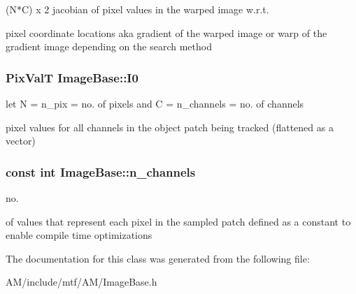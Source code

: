 (N$\ast$\-C) x 2 jacobian of pixel values in the warped image w.\-r.\-t. 

pixel coordinate locations aka gradient of the warped image or warp of the gradient image depending on the search method \hypertarget{classImageBase_a6e5beaedb0a6d8e511446443dc2b80dc}{
\subsubsection[{I0}]{\setlength{\rightskip}{0pt plus 5cm}Pix\-Val\-T Image\-Base\-::\-I0\hspace{0.3cm}{\ttfamily [protected]}}}\label{classImageBase_a6e5beaedb0a6d8e511446443dc2b80dc}


let N = n\-\_\-pix = no. of pixels and C = n\-\_\-channels = no. of channels 

pixel values for all channels in the object patch being tracked (flattened as a vector) \hypertarget{classImageBase_ac16eaa560cdf51fc9232ae115c3567e2}{
\subsubsection[{n\-\_\-channels}]{\setlength{\rightskip}{0pt plus 5cm}const int Image\-Base\-::n\-\_\-channels\hspace{0.3cm}{\ttfamily [protected]}}}\label{classImageBase_ac16eaa560cdf51fc9232ae115c3567e2}


no. 

of values that represent each pixel in the sampled patch defined as a constant to enable compile time optimizations 

The documentation for this class was generated from the following file\-:\begin{DoxyCompactItemize}
\item 
A\-M/include/mtf/\-A\-M/Image\-Base.\-h\end{DoxyCompactItemize}
